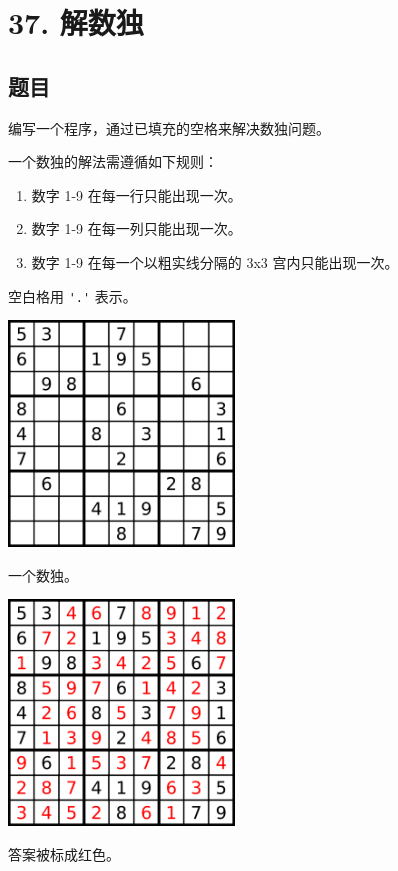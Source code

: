 \newpage
\section{37. 解数独}
\label{leetcode:37}

\subsection{题目}

编写一个程序，通过已填充的空格来解决数独问题。

一个数独的解法需遵循如下规则：

\begin{enumerate}
  \item 数字 1-9 在每一行只能出现一次。
  \item 数字 1-9 在每一列只能出现一次。
  \item 数字 1-9 在每一个以粗实线分隔的 3x3 宫内只能出现一次。
\end{enumerate}

空白格用 \verb|'.'| 表示。

\includegraphics[width=60mm,height=60mm]{images/leetcode/37_sudo.png}

一个数独。

\includegraphics[width=60mm,height=60mm]{images/leetcode/37_sudo_solution.png}

答案被标成红色。

